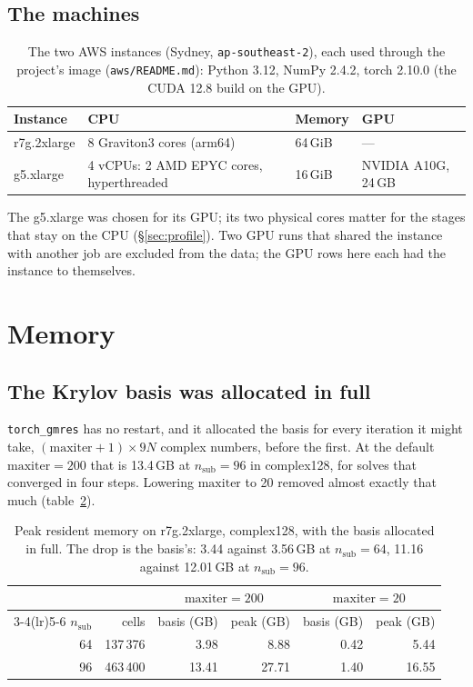 \documentclass[11pt,a4paper]{article}
\newcommand{\nsub}{n_{\mathrm{sub}}}
\newcommand{\code}[1]{\nolinkurl{#1}}
\begin{document}
\subsection{The machines}

\begin{table}[h]
\centering
\caption{The two AWS instances (Sydney, \code{ap-southeast-2}), each used through the project's image
(\code{aws/README.md}): Python 3.12, NumPy 2.4.2, torch 2.10.0 (the CUDA 12.8 build on the GPU).}
\label{tab:machines}
\small
\begin{tabular}{llll}
\toprule
Instance & CPU & Memory & GPU \\
\midrule
r7g.2xlarge & 8 Graviton3 cores (arm64) & 64\,GiB & --- \\
g5.xlarge & 4 vCPUs: 2 AMD EPYC cores, hyperthreaded & 16\,GiB & NVIDIA A10G, 24\,GB \\
\bottomrule
\end{tabular}
\end{table}

The g5.xlarge was chosen for its GPU; its two physical cores matter for the stages that stay on the CPU
(\S\ref{sec:profile}). Two GPU runs that shared the instance with another job are excluded from the data; the GPU
rows here each had the instance to themselves.

\section{Memory}\label{sec:memory}

\subsection{The Krylov basis was allocated in full}

\code{torch_gmres} has no restart, and it allocated the basis for every iteration it might take,
$(\mathrm{maxiter}+1) \times 9N$ complex numbers, before the first. At the default $\mathrm{maxiter} = 200$ that is
13.4\,GB at $\nsub = 96$ in complex128, for solves that converged in four steps. Lowering $\mathrm{maxiter}$ to 20
removed almost exactly that much (table~\ref{tab:krylov}).

\begin{table}[h]
\centering
\caption{Peak resident memory on r7g.2xlarge, complex128, with the basis allocated in full. The drop is the
basis's: 3.44 against 3.56\,GB at $\nsub = 64$, 11.16 against 12.01\,GB at $\nsub = 96$.}
\label{tab:krylov}
\begin{tabular}{rrrrrr}
\toprule
& & \multicolumn{2}{c}{$\mathrm{maxiter} = 200$} & \multicolumn{2}{c}{$\mathrm{maxiter} = 20$} \\
\cmidrule(lr){3-4}\cmidrule(lr){5-6}
$\nsub$ & cells & basis (GB) & peak (GB) & basis (GB) & peak (GB) \\
\midrule
64 & 137\,376 & 3.98 & 8.88 & 0.42 & 5.44 \\
96 & 463\,400 & 13.41 & 27.71 & 1.40 & 16.55 \\
\bottomrule
\end{tabular}
\end{table}
\end{document}
